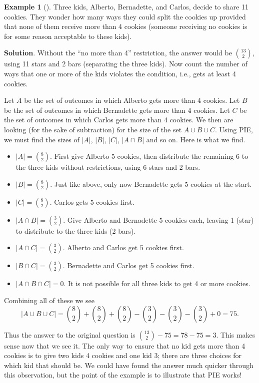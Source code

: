\documentclass[10pt,]{book}
\theoremstyle{plain}
\theoremstyle{definition}
\theoremstyle{definition}
\newtheorem{example}[theorem]{Example}
\theoremstyle{definition}
\theoremstyle{definition}
\numberwithin{equation}{chapter}
\begin{document}
\begin{example}[]\label{example-11}
\hypertarget{p-949}{}%
Three kids, Alberto, Bernadette, and Carlos, decide to share 11 cookies. They wonder how many ways they could split the cookies up provided that none of them receive more than 4 cookies (someone receiving no cookies is for some reason acceptable to these kids).%
\par\smallskip%
\noindent\textbf{Solution}.\hypertarget{solution-78}{}\quad%
\hypertarget{p-950}{}%
Without the ``no more than 4'' restriction, the answer would be \({13 \choose 2}\), using 11 stars and 2 bars (separating the three kids). Now count the number of ways that one or more of the kids violates the condition, i.e., gets at least 4 cookies.%
\par
\hypertarget{p-951}{}%
Let \(A\) be the set of outcomes in which Alberto gets more than 4 cookies. Let \(B\) be the set of outcomes in which Bernadette gets more than 4 cookies. Let \(C\) be the set of outcomes in which Carlos gets more than 4 cookies. We then are looking (for the sake of subtraction) for the size of the set \(A \cup B \cup C\). Using PIE, we must find the sizes of \(|A|\), \(|B|\), \(|C|\), \(|A\cap B|\) and so on. Here is what we find.%
\par
\hypertarget{p-952}{}%
\leavevmode%
\begin{itemize}[label=\textbullet]
\item{}\(|A| = {8 \choose 2}\). First give Alberto 5 cookies, then distribute the remaining 6 to the three kids without restrictions, using 6 stars and 2 bars.%
\item{}\(|B| = {8 \choose 2}\). Just like above, only now Bernadette gets 5 cookies at the start.%
\item{}\(|C| = {8 \choose 2}\). Carlos gets 5 cookies first.%
\item{}\(|A \cap B| = {3 \choose 2}\). Give Alberto and Bernadette 5 cookies each, leaving 1 (star) to distribute to the three kids (2 bars).%
\item{}\(|A \cap C| = {3 \choose 2}\). Alberto and Carlos get 5 cookies first.%
\item{}\(|B \cap C| = {3 \choose 2}\). Bernadette and Carlos get 5 cookies first.%
\item{}\(|A \cap B \cap C| = 0\). It is not possible for all three kids to get 4 or more cookies.%
\end{itemize}
%
\par
\hypertarget{p-953}{}%
Combining all of these we see%
\begin{equation*}
|A \cup B \cup C| = {8 \choose 2} + {8 \choose 2} + {8 \choose 2} - {3 \choose 2} - {3 \choose 2} - {3 \choose 2} + 0 = 75.
\end{equation*}
%
\par
\hypertarget{p-954}{}%
Thus the answer to the original question is \({13 \choose 2} - 75 = 78 - 75 = 3\). This makes sense now that we see it. The only way to ensure that no kid gets more than 4 cookies is to give two kids 4 cookies and one kid 3; there are three choices for which kid that should be. We could have found the answer much quicker through this observation, but the point of the example is to illustrate that PIE works!%
\end{example}
\end{document}
